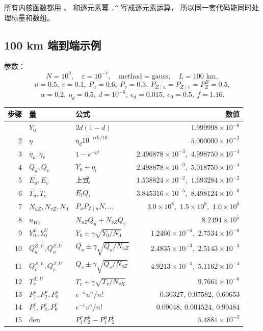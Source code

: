 \documentclass[UTF8,11pt,a4paper]{ctexart}
\newcommand{\code}[1]{\texttt{\detokenize{#1}}}
\begin{document}
所有内核函数都用 \code{.*}、\code{./} 和逐元素幂 \verb|.^| 写成逐元素运算，
所以同一套代码能同时处理标量和数组。

\subsection{100 km 端到端示例}

参数：
\[
N=10^9,\quad \varepsilon=10^{-7},\quad \text{method}=\text{gauss},\quad L=100\text{ km},
\]
\[
u=0.5,\ v=0.1,\ P_u=0.6,\ P_v=0.3,\
P_{Z\mid u}=P_{Z\mid v}=P_Z^{B}=0.5,
\]
\[
\alpha=0.2,\ \eta_d=0.5,\ d=10^{-6},\ e_d=0.015,\ e_0=0.5,\ f=1.16.
\]

\begin{longtable}{@{}rllr@{}}
\toprule
步骤 & 量 & 公式 & 数值\\
\midrule
\endhead
\bottomrule
\endlastfoot
1 & $Y_0$ & $2d(1-d)$ & $1.999998\times10^{-6}$\\
2 & $\eta$ & $\eta_d10^{-\alpha L/10}$ & $5.000000\times10^{-3}$\\
3 & $\eta_u,\eta_v$ & $1-e^{-\eta l}$ & $2.496878\times10^{-3}$,\ $4.998750\times10^{-4}$\\
4 & $Q_u,Q_v$ & $Y_0+\eta_l$ & $2.498878\times10^{-3}$,\ $5.018750\times10^{-4}$\\
5 & $E_u,E_v$ & 上式 & $1.538824\times10^{-2}$,\ $1.693284\times10^{-2}$\\
6 & $T_u,T_v$ & $E_lQ_l$ & $3.845316\times10^{-5}$,\ $8.498124\times10^{-6}$\\
7 & $N_{uZ},N_{vZ},N_0$ & $P_uP_{Z\mid u}N,\ldots$ & $3.0\times10^8$,\ $1.5\times10^8$,\ $1.0\times10^8$\\
8 & $n_{Wz}$ & $N_{uZ}Q_u+N_{vZ}Q_v$ & $8.2494\times10^5$\\
9 & $Y_0^L,Y_0^U$ & $Y_0\pm\gamma\sqrt{Y_0/N_0}$ & $1.2466\times10^{-6}$,\ $2.7534\times10^{-6}$\\
10 & $Q_u^{Z,L},Q_u^{Z,U}$ & $Q_u\pm\gamma\sqrt{Q_u/N_{uZ}}$ & $2.4835\times10^{-3}$,\ $2.5143\times10^{-3}$\\
11 & $Q_v^{Z,L},Q_v^{Z,U}$ & $Q_v\pm\gamma\sqrt{Q_v/N_{vZ}}$ & $4.9213\times10^{-4}$,\ $5.1162\times10^{-4}$\\
12 & $T_v^{X,U}$ & $T_v+\gamma\sqrt{T_v/N_{vX}}$ & $9.7661\times10^{-6}$\\
13 & $P_1^u,P_2^u,P_0^u$ & $e^{-u}u^n/n!$ & $0.30327,\ 0.07582,\ 0.60653$\\
14 & $P_1^v,P_2^v,P_0^v$ & $e^{-v}v^n/n!$ & $0.09048,\ 0.004524,\ 0.90484$\\
15 & $\mathrm{den}$ & $P_1^vP_2^u-P_1^uP_2^v$ & $5.4881\times10^{-3}$\\

\end{longtable}
\end{document}
